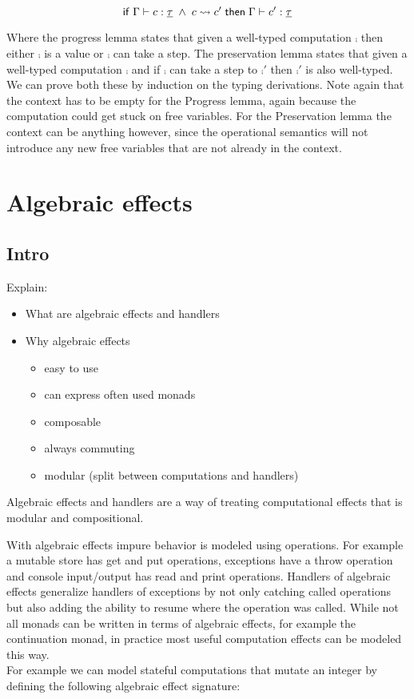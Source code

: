{\begin{lemma}[Preservation]
\[
	\mathsf{if}\;
		\Gamma \vdash c : \underline{\tau}
		\;\land\;
		c \rightsquigarrow c'
	\;\mathsf{then}\;
		\Gamma \vdash c' : \underline{\tau}
\]
\end{lemma}

Where the progress lemma states that given a well-typed computation $\comp$ then either $\comp$ is a value or $\comp$ can take a  step. The preservation lemma states that given a well-typed computation $\comp$ and if $\comp$ can take a step to $\comp'$ then $\comp'$ is also well-typed. We can prove both these by induction on the typing derivations. Note again that the context has to be empty for the Progress lemma, again because the computation could get stuck on free variables. For the Preservation lemma the context can be anything however, since the operational semantics will not introduce any new free variables that are not already in the context.

\newpage
\section{Algebraic effects} \label{section:algeff}

\subsection{Intro}
Explain:
\begin{itemize}
	\item What are algebraic effects and handlers
	\item Why algebraic effects
	\begin{itemize}
		\item easy to use
		\item can express often used monads
		\item composable
		\item always commuting
		\item modular (split between computations and handlers)
	\end{itemize}
\end{itemize}

Algebraic effects and handlers are a way of treating computational effects that is modular and compositional.

With algebraic effects impure behavior is modeled using operations.
For example a mutable store has get and put operations, exceptions have a throw operation and console input/output has read and print operations.
Handlers of algebraic effects generalize handlers of exceptions by not only catching called operations but also adding the ability to resume where the operation was called.
While not all monads can be written in terms of algebraic effects, for example the continuation monad, in practice most useful computation effects can be modeled this way.
\\
For example we can model stateful computations that mutate an integer by defining the following algebraic effect signature:

}
